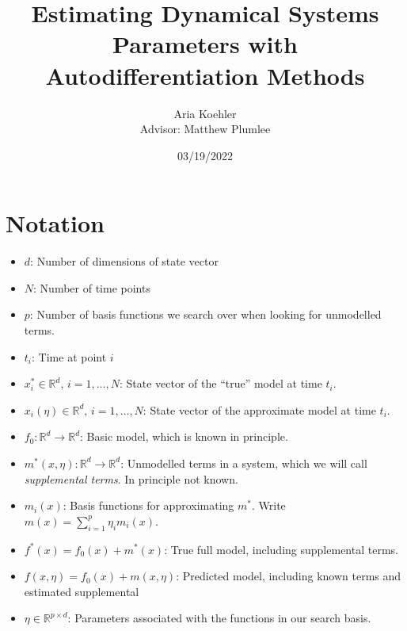 \documentclass[12pt]{article}
\author{Aria Koehler\\{\small Advisor: Matthew Plumlee}}
\title{Estimating Dynamical Systems Parameters with Autodifferentiation Methods}
\date{03/19/2022}
\begin{document}
\maketitle



  


\section{Notation}

\begin{itemize}

\item
  $d$: Number of dimensions of state vector

\item
  $N$: Number of time points

\item
  $p$: Number of basis functions we search over when looking for unmodelled terms.

\item
  $t_i$: Time at point $i$
  
\item
  $x_i^* \in \mathbb{R}^d,\, i=1,\ldots, N$: State vector of the ``true'' model at time $t_i$. 

\item
  $x_i(\eta) \in \mathbb{R}^d,\, i=1,\ldots, N$: State vector of the approximate model at time $t_i$. 
  
\item
  $f_0: \mathbb{R}^d \to \mathbb{R}^d$: Basic model, which is known in principle.

\item
  $m^*(x, \eta): \mathbb{R}^d \to \mathbb{R}^d$: Unmodelled terms in a system, which we will call \textit{supplemental terms}. In principle not known.

\item
  $m_i(x)$: Basis functions for approximating $m^*$. Write $m(x) = \sum_{i=1}^{p} \eta_i m_i(x)$.

\item
  $f^*(x) = f_0(x) + m^*(x)$: True full model, including supplemental terms.

\item
  $f(x, \eta) = f_0(x) + m(x, \eta)$: Predicted model, including known terms and estimated supplemental  
  
\item
  $\eta \in \mathbb{R}^{p \times d}$: Parameters associated with the functions in our search basis.

\end{itemize}
\end{document}
